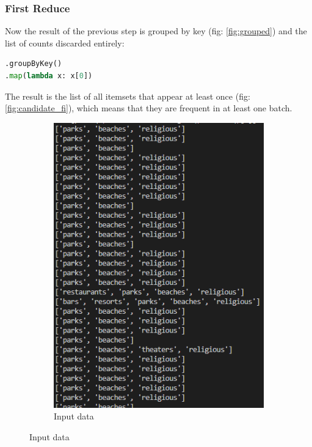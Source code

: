 \documentclass[a4paper]{article}
\begin{document}
	\subsubsection{First Reduce}
	Now the result of the previous step is grouped by key (fig: \ref{fig:grouped}) and the list of counts discarded entirely:
	\begin{lstlisting}[language=Python]
.groupByKey()
.map(lambda x: x[0])
	\end{lstlisting}
	The result is the list of all itemsets that appear at least once (fig: \ref{fig:candidate_fi}), which means that they are frequent in at least one batch.
	
	\begin{figure}[h]
		\centering
		
		\begin{subfigure}[b]{0.24\textwidth}
			\centering
			\includegraphics[width=\textwidth]{Baskets.PNG}
         	\caption{Input data}
         	\label{fig:input_data}

\end{subfigure}
\end{figure}
\end{document}

